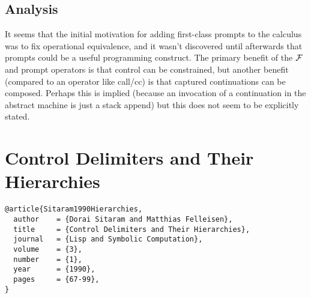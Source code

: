 \documentclass[letterpaper]{llncs}
\begin{document}
\subsection*{Analysis}

It seems that the initial motivation for adding first-class prompts to the calculus was to fix operational equivalence, and it wasn't discovered until afterwards that prompts could be a useful programming construct. The primary benefit of the $ \mathcal{F} $ and prompt operators is that control can be constrained, but another benefit (compared to an operator like call/cc) is that captured continuations can be composed. Perhaps this is implied (because an invocation of a continuation in the abstract machine is just a stack append) but this does not seem to be explicitly stated.






\section*{Control Delimiters and Their Hierarchies}%

\begin{verbatim}
@article{Sitaram1990Hierarchies,
  author    = {Dorai Sitaram and Matthias Felleisen},
  title     = {Control Delimiters and Their Hierarchies},
  journal   = {Lisp and Symbolic Computation},
  volume    = {3},
  number    = {1},
  year      = {1990},
  pages     = {67-99},
}
\end{verbatim}

\end{document}
